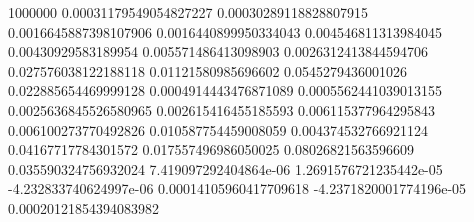 {1000000 0.00031179549054827227 0.00030289118828807915 0.0016645887398107906 0.0016440899950334043 0.004546811313984045 0.00430929583189954 0.005571486413098903 0.0026312413844594706 0.027576038122188118 0.01121580985696602 0.0545279436001026 0.022885654469999128 0.0004914443476871089 0.0005562441039013155 0.0025636845526580965 0.002615416455185593 0.006115377964295843 0.006100273770492826 0.010587754459008059 0.004374532766921124 0.04167717784301572 0.017557496986050025 0.08026821563596609 0.035590324756932024 7.419097292404864e-06 1.2691576721235442e-05 -4.232833740624997e-06 0.00014105960417709618 -4.2371820001774196e-05 0.00020121854394083982
}\dataA

